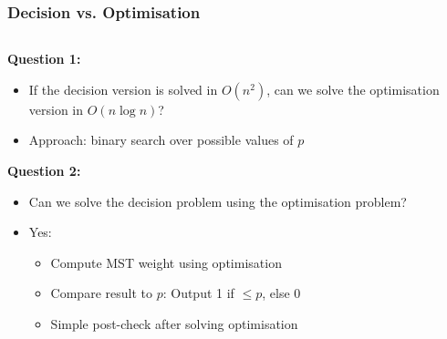 \documentclass[10pt,aspectratio=43]{beamer}
\begin{document}
\begin{frame}
  \frametitle{Decision vs. Optimisation}

  \begin{columns}
    \begin{column}{0.6\textwidth}
      \textbf{Question 1:}
      \begin{itemize}
          \item If the decision version is solved in $O(n^2)$, 
                can we solve the optimisation version in $O(n \log n)$?
          \item Approach: binary search over possible values of $p$
      \end{itemize}

      \vspace{0.4cm}
      \textbf{Question 2:}
      \begin{itemize}
          \item Can we solve the decision problem using the optimisation problem?
          \item Yes:
            \begin{itemize}
                \item Compute MST weight using optimisation
                \item Compare result to $p$: Output 1 if $\leq p$, else 0
                \item Simple post-check after solving optimisation
            \end{itemize}
      \end{itemize}
    \end{column}


\end{columns}
\end{frame}
\end{document}
